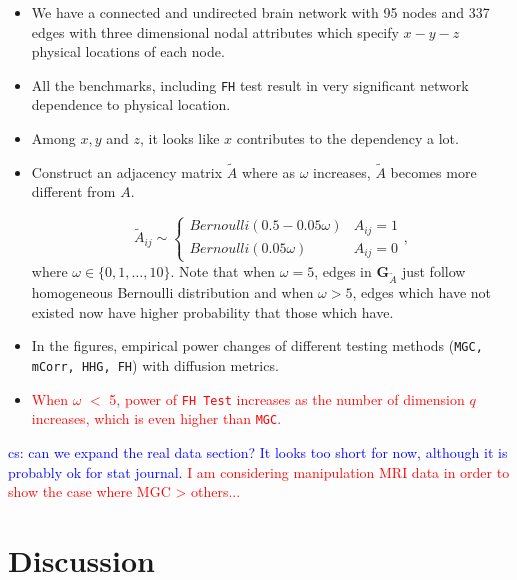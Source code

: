 \documentclass[11pt]{article}
\theoremstyle{definition}
\newcommand{\cs}[1]{\textcolor{blue}{cs: #1}}
\begin{document}
	\begin{itemize}
		\item We have a connected and undirected brain network with 95 nodes and 337 edges with three dimensional nodal attributes which specify $x-y-z$ physical locations of each node.
		\item All the benchmarks, including \texttt{FH} test result in very significant network dependence to physical location. 
		\item Among $x,y$ and $z$, it looks like $x$ contributes to the dependency a lot.
		\item Construct an adjacency matrix $\tilde{A}$ where as $\omega$ increases, $\tilde{A}$ becomes more different from $A$.
		
\begin{equation}
	\tilde{A}_{ij} \sim \left\{   \begin{array}{cc} Bernoulli( 0.5 - 0.05 \omega   ) & A_{ij} = 1 \\ Bernoulli(0.05 \omega) & A_{ij} = 0 \end{array} \right. ,
	\label{eq:randomedge}
\end{equation}
where $\omega \in \{ 0, 1, \ldots, 10 \}$. Note that when $\omega = 5$, edges in $\mathbf{G}_{\tilde{A}}$ just follow homogeneous Bernoulli distribution and when $\omega > 5$, edges which have not existed now have higher probability that those which have.	
		
\item In the figures, empirical power changes of different testing methods (\texttt{MGC, mCorr, HHG, FH}) with diffusion metrics.
\item \textcolor{red}{When $\omega$ $<$ 5, power of \texttt{FH Test} increases as the number of dimension $q$ increases, which is even higher than \texttt{MGC}. }
\end{itemize}
	

	\cs{can we expand the real data section? It looks too short for now, although it is probably ok for stat journal.}
	\textcolor{red}{I am considering manipulation MRI data in order to show the case where MGC > others... }
	
	\section{Discussion}
	\label{sec:conc}
	
\end{document}

